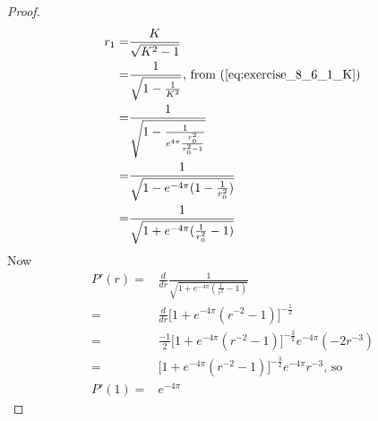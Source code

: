 \documentclass[]{article}
\begin{document}
\begin{proof}
\begin{align*}
	r_1=&\frac{K}{\sqrt{K^2-1}}\\
	=&\frac{1}{\sqrt{1-\frac{1}{K^2}}}\text{, from (\ref{eq:exercise_8_6_1_K})}\\
	=&\frac{1}{\sqrt{1-\frac{1}{e^{4 \pi} \frac{r_0^2}{r_0^2-1}}}}\\
	=&\frac{1}{\sqrt{1-e^{-4\pi}(1-\frac{1}{r_0^2})}}\\
	=&\frac{1}{\sqrt{1+e^{-4\pi}(\frac{1}{r_0^2}-1)}}
	\end{align*}
	Now
	\begin{align*}
	P'(r) =& \frac{d}{dr} \frac{1}{\sqrt{1+e^{-4\pi}(\frac{1}{r^2}-1)}}\\
	=& \frac{d}{dr} \bigg[1+e^{-4\pi}(r^{-2}-1)\bigg]^{-\frac{1}{2}}\\
	=&  \frac{-1}{2}\bigg[1+e^{-4\pi}(r^{-2}-1)\bigg]^{-\frac{3}{2}} e^{-4\pi} (-2 r^{-3})\\
	=&  \bigg[1+e^{-4\pi}(r^{-2}-1)\bigg]^{-\frac{3}{2}} e^{-4\pi}  r^{-3}\text{, so}\\
	P'(1) =&  e^{-4\pi}
	\end{align*}
\end{proof}





\end{document}
